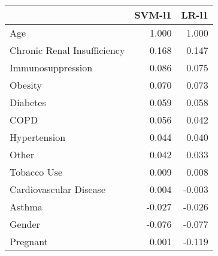\begin{tabular}{lrr}
\toprule
{} &  SVM-l1 &  LR-l1 \\
\midrule
Age                         &   1.000 &  1.000 \\
Chronic Renal Insufficiency &   0.168 &  0.147 \\
Immunosuppression           &   0.086 &  0.075 \\
Obesity                     &   0.070 &  0.073 \\
Diabetes                    &   0.059 &  0.058 \\
COPD                        &   0.056 &  0.042 \\
Hypertension                &   0.044 &  0.040 \\
Other                       &   0.042 &  0.033 \\
Tobacco Use                 &   0.009 &  0.008 \\
Cardiovascular Disease      &   0.004 & -0.003 \\
Asthma                      &  -0.027 & -0.026 \\
Gender                      &  -0.076 & -0.077 \\
Pregnant                    &   0.001 & -0.119 \\
\bottomrule
\end{tabular}
